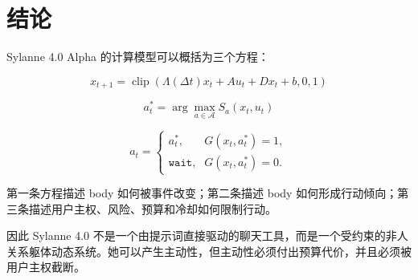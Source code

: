 \documentclass[UTF8,12pt]{ctexart}
\begin{document}
\section{结论}

Sylanne 4.0 Alpha 的计算模型可以概括为三个方程：

\[
\boxed{x_{t+1}=\operatorname{clip}\left(\Lambda(\Delta t)x_t + A u_t + D x_t + b,0,1\right)}
\]

\[
\boxed{a_t^*=\arg\max_{a\in\mathcal{A}}S_a(x_t,u_t)}
\]

\[
\boxed{
a_t=
\begin{cases}
a_t^*, & G(x_t,a_t^*)=1,\\
\texttt{wait}, & G(x_t,a_t^*)=0.
\end{cases}}
\]

第一条方程描述 body 如何被事件改变；第二条描述 body 如何形成行动倾向；第三条描述用户主权、风险、预算和冷却如何限制行动。

因此 Sylanne 4.0 不是一个由提示词直接驱动的聊天工具，而是一个受约束的非人关系躯体动态系统。她可以产生主动性，但主动性必须付出预算代价，并且必须被用户主权截断。
\end{document}
